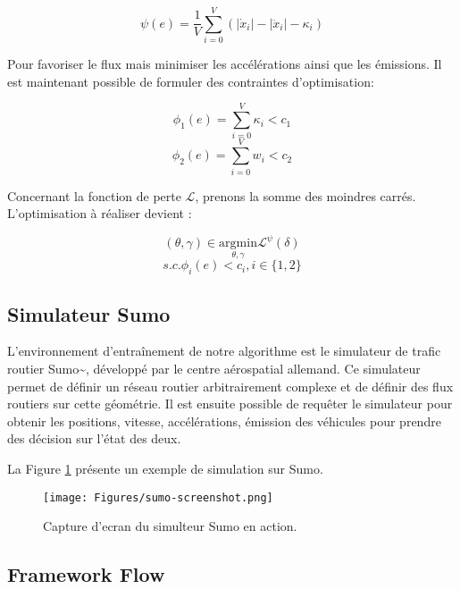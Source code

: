 \documentclass[11pt]{article}
\begin{document}
\begin{latex}
\[
\psi (e) = \frac{1}{V}\sum_{i=0}^V(|\dot{x}_i| - |\ddot{x}_i| - \kappa_i)
\]
\end{latex}

Pour favoriser le flux mais minimiser les accélérations ainsi que les émissions. Il est maintenant possible de formuler des contraintes d'optimisation:

\begin{latex}
\[\phi_1(e) = \sum_{i=0}^V\kappa_i < c_1\]
\[\phi_2(e) = \sum_{i=0}^Vw_i < c_2\]
\end{latex}

Concernant la fonction de perte \(\mathcal{L}\), prenons la somme des moindres carrés. L'optimisation à réaliser devient :

\begin{latex}
\[(\theta, \gamma) \in \underset{\theta, \gamma}{\mathrm{argmin}} \mathcal{L}^\psi(\delta)\]
\[s.c. \phi_i(e) < c_i, i \in \{1,2\}\]
\end{latex}

\subsection{Simulateur Sumo}
\label{sec:org49f30a6}

L'environnement d'entraînement de notre algorithme est le simulateur de trafic routier Sumo\textasciitilde{}\cite{SUMO2012}, développé par le centre aérospatial allemand. Ce simulateur permet de définir un réseau routier arbitrairement complexe et de définir des flux routiers sur cette géométrie. Il est ensuite possible de requêter le simulateur pour obtenir les positions, vitesse, accélérations, émission des véhicules pour prendre des décision sur l'état des deux.

La Figure \ref{fig:sumo-sim} présente un exemple de simulation sur Sumo.

\begin{latex}
\begin{figure}
\centering
\texttt{[image: Figures/sumo-screenshot.png]}
\caption[sumo-sim]{Capture d'ecran du simulteur Sumo en action.}
\label{fig:sumo-sim}
\end{figure}
\end{latex}

\subsection{Framework Flow}
\label{sec:org48f701a}
\end{document}

